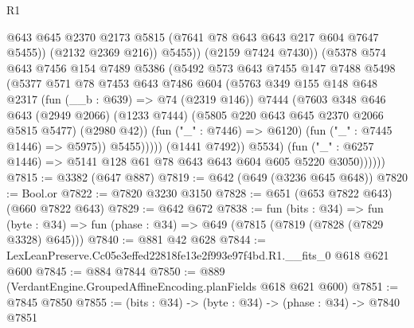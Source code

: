 \begin{lexlean}{R1}
\begin{coremodule}
                                @643
                                @645
                                @2370
                                @2173
                                @5815
                                (@7641 @78 @643 @643 @217 @604 @7647 @5455))
                              (@2132 @2369 @216))
                            @5455))
                        (@2159 @7424 @7430))
                      (@5378
                        @574
                        @643
                        @7456
                        @154
                        @7489
                        @5386
                        (@5492
                          @573
                          @643
                          @7455
                          @147
                          @7488
                          @5498
                          (@5377
                            @571
                            @78
                            @7453
                            @643
                            @7486
                            @604
                            (@5763
                              @349
                              @155
                              @148
                              @648
                              @2317
                              (fun (__b : @639) => @74 (@2319 @146))
                              @7444
                              (@7603
                                @348
                                @646
                                @643
                                (@2949 @2066)
                                (@1233 @7444)
                                (@5805 @220 @643 @645 @2370 @2066 @5815 @5477)
                                (@2980 @42))
                              (fun ("_" : @7446) => @6120)
                              (fun ("_" : @7445 @1446) => @5975))
                            @5455)))))
                  (@1441 @7492))
                @5534)
              (fun ("_" : @6257 @1446) => @5141 @128 @61 @78 @643 @643 @604 @605 @5220 @3050))))))
@7815 := @3382 (@647 @887)
@7819 := @642 (@649 (@3236 @645 @648))
@7820 := Bool.or
@7822 := @7820 @3230 @3150
@7828 := @651 (@653 @7822 @643) (@660 @7822 @643)
@7829 := @642 @672
@7838 := fun (bits : @34) =>
  fun (byte : @34) => fun (phase : @34) => @649 (@7815 (@7819 (@7828 (@7829 @3328) @645)))
@7840 := @881 @42 @628
@7844 := LexLeanPreserve.Cc05e3effed22818fe13e2f993e97f4bd.R1.__fits_0 @618 @621 @600
@7845 := @884 @7844
@7850 := @889 (VerdantEngine.GroupedAffineEncoding.planFields @618 @621 @600)
@7851 := @7845 @7850
@7855 := (bits : @34) -> (byte : @34) -> (phase : @34) -> @7840 @7851

\end{coremodule}
\end{lexlean}
